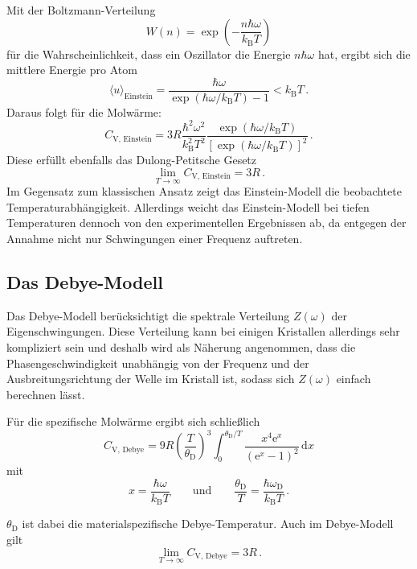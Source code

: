 Mit der Boltzmann-Verteilung
\begin{equation*}
  W(n) = \exp\left( -\frac{n\hbar\omega}{k_\text{B}T} \right)
\end{equation*}
für die Wahrscheinlichkeit, dass ein Oszillator die Energie $n\hbar\omega$ hat, ergibt sich die mittlere Energie pro Atom
\begin{equation}
  \langle u \rangle_\text{Einstein} = \frac{\hbar\omega}{\exp(\hbar\omega/k_\text{B}T) - 1} < k_\text{B}T \,.
\end{equation}
Daraus folgt für die Molwärme:
\begin{equation}
  C_\text{V, Einstein} = 3R\frac{\hbar^2\omega^2}{k_\text{B}^2T^2}
                          \frac{\exp(\hbar\omega/k_\text{B}T)}{\left[\exp(\hbar\omega/k_\text{B}T)\right]^2} \,.
\end{equation}
Diese erfüllt ebenfalls das Dulong-Petitsche Gesetz
\begin{equation*}
  \lim_{T\to\infty} C_\text{V, Einstein} = 3R\,.
\end{equation*}
Im Gegensatz zum klassischen Ansatz zeigt das Einstein-Modell die beobachtete Temperaturabhängigkeit. Allerdings weicht das
Einstein-Modell bei tiefen Temperaturen dennoch von den experimentellen Ergebnissen ab, da entgegen der Annahme
nicht nur Schwingungen einer Frequenz auftreten.

\subsection{Das Debye-Modell}
Das Debye-Modell berücksichtigt die spektrale Verteilung $Z(\omega)$ der Eigenschwingungen. Diese Verteilung kann bei einigen
Kristallen allerdings sehr kompliziert sein und deshalb wird als Näherung angenommen, dass die Phasengeschwindigkeit
unabhängig von der Frequenz und der Ausbreitungsrichtung der Welle im Kristall ist, sodass sich $Z(\omega)$ einfach berechnen lässt.


Für die spezifische Molwärme ergibt sich schließlich
\begin{equation}
  C_\text{V, Debye} = 9R \left(\frac{T}{\theta_\text{D}}\right)^3 \int_0^{\theta_\text{D}/T} \frac{x^4\text{e}^x}{(\text{e}^x-1)^2}\,\text{d}x
\end{equation}
mit
\begin{equation*}
  x = \frac{\hbar\omega}{k_\text{B}T} \qquad \text{und} \qquad \frac{\theta_\text{D}}{T} = \frac{\hbar\omega_\text{D}}{k_\text{B}T}\,.
\end{equation*}

$\theta_\text{D}$ ist dabei die materialspezifische Debye-Temperatur. Auch im Debye-Modell gilt
\begin{equation*}
  \lim_{T\to\infty} C_\text{V, Debye} = 3R \,.
\end{equation*}

